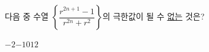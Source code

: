 다음 중 수열 $\left\{\dfrac{r^{2n+1}-1}{r^{2n}+r^2}\right\}$의 극한값이 될 수 \underline{없는} 것은? 
\begin{choices32}{$-2$}{$-1$}{$0$}{$1$}{$2$}\end{choices32}
